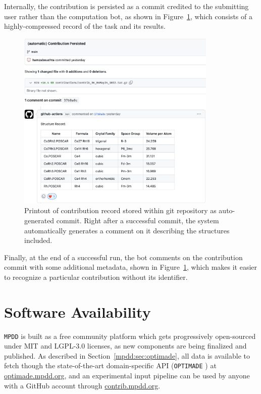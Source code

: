 Internally, the contribution is persisted as a commit credited to the submitting user rather than the computation bot, as shown in Figure~\ref{mpdd:fig:mpddx4}, which consists of a highly-compressed record of the task and its results.

\begin{figure}[H]
    \centering
    \includegraphics[width=0.85\textwidth]{mpdd/mpddx4.png}
    \caption{Printout of contribution record stored within git repository as auto-generated commit. Right after a successful commit, the system automatically generates a comment on it describing the structures included.}
    \label{mpdd:fig:mpddx4}
\end{figure}

Finally, at the end of a successful run, the bot comments on the contribution commit with some additional metadata, shown in Figure~\ref{mpdd:fig:mpddx4}, which makes it easier to recognize a particular contribution without its identifier.


\section{Software Availability} \label{mpdd:sec:softwareavaialbility}

\texttt{MPDD} is built as a free community platform which gets progressively open-sourced under MIT and LGPL-3.0 licenses, as new components are being finalized and published. As described in Section~\ref{mpdd:sec:optimade}, all data is available to fetch though the state-of-the-art domain-specific API (\texttt{OPTIMADE} \cite{Evans2024DevelopmentsExchange}) at \href{https://optimade.mpdd.org}{optimade.mpdd.org}, and an experimental input pipeline can be used by anyone with a GitHub account through \href{https://contrib.mpdd.org}{contrib.mpdd.org}.



